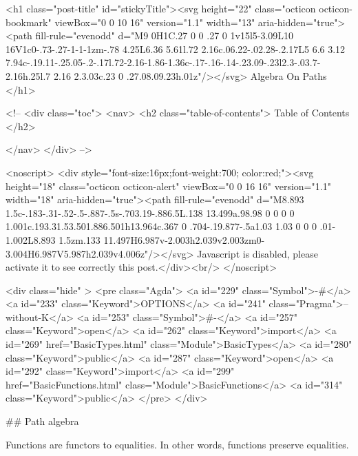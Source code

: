   <h1 class="post-title" id="stickyTitle"><svg height="22" class="octicon octicon-bookmark" viewBox="0 0 10 16" version="1.1" width="13" aria-hidden="true"><path fill-rule="evenodd" d="M9 0H1C.27 0 0 .27 0 1v15l5-3.09L10 16V1c0-.73-.27-1-1-1zm-.78 4.25L6.36 5.61l.72 2.16c.06.22-.02.28-.2.17L5 6.6 3.12 7.94c-.19.11-.25.05-.2-.17l.72-2.16-1.86-1.36c-.17-.16-.14-.23.09-.23l2.3-.03.7-2.16h.25l.7 2.16 2.3.03c.23 0 .27.08.09.23h.01z"/></svg> Algebra On Paths
  </h1>

  <!-- 
  <div class="toc">
    <nav>
    <h2 class="table-of-contents"> Table of Contents </h2>
      

    </nav>
  </div>
   -->

  <noscript>
  <div style="font-size:16px;font-weight:700; color:red;"><svg height="18" class="octicon octicon-alert" viewBox="0 0 16 16" version="1.1" width="18" aria-hidden="true"><path fill-rule="evenodd" d="M8.893 1.5c-.183-.31-.52-.5-.887-.5s-.703.19-.886.5L.138 13.499a.98.98 0 0 0 0 1.001c.193.31.53.501.886.501h13.964c.367 0 .704-.19.877-.5a1.03 1.03 0 0 0 .01-1.002L8.893 1.5zm.133 11.497H6.987v-2.003h2.039v2.003zm0-3.004H6.987V5.987h2.039v4.006z"/></svg> Javascript is disabled, please activate it to see correctly this post.</div><br/>
  </noscript>

  <div class="hide" >
<pre class="Agda">
<a id="229" class="Symbol">{-#</a> <a id="233" class="Keyword">OPTIONS</a> <a id="241" class="Pragma">--without-K</a> <a id="253" class="Symbol">#-}</a>
<a id="257" class="Keyword">open</a> <a id="262" class="Keyword">import</a> <a id="269" href="BasicTypes.html" class="Module">BasicTypes</a> <a id="280" class="Keyword">public</a>
<a id="287" class="Keyword">open</a> <a id="292" class="Keyword">import</a> <a id="299" href="BasicFunctions.html" class="Module">BasicFunctions</a> <a id="314" class="Keyword">public</a>
</pre>
</div>

## Path algebra

Functions are functors to equalities.  In other words, functions
preserve equalities.

